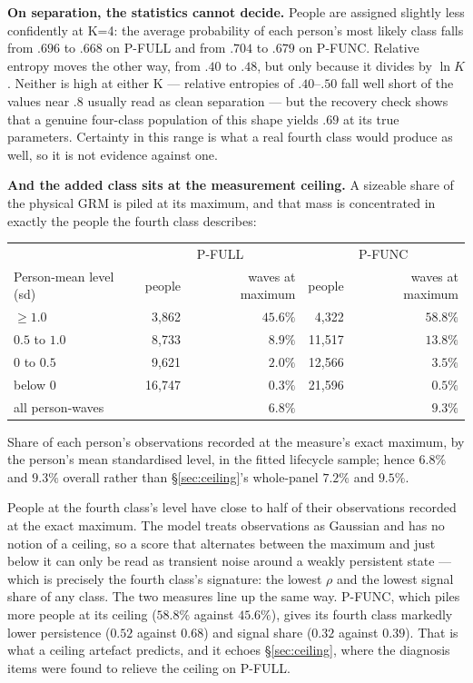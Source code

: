 \documentclass[11pt]{article}
\begin{document}
\textbf{On separation, the statistics cannot decide.} People are assigned
slightly less confidently at K=4: the average probability of each person's
most likely class falls from $.696$ to $.668$ on P-FULL and from $.704$ to
$.679$ on P-FUNC. Relative entropy moves the other way, from $.40$ to $.48$,
but only because it divides by $\ln K$. Neither is high at either K ---
relative entropies of $.40$--$.50$ fall well short of the values near $.8$
usually read as clean separation --- but the recovery check shows that a
genuine four-class population of this shape yields $.69$ at its true
parameters. Certainty in this range is what a real fourth class would produce
as well, so it is not evidence against one.

\textbf{And the added class sits at the measurement ceiling.} A sizeable
share of the physical GRM is piled at its maximum, and that mass is
concentrated in exactly the people the fourth class describes:

\begin{center}\small
\begin{tabular}{lrrrr}
\toprule
 & \multicolumn{2}{c}{P-FULL} & \multicolumn{2}{c}{P-FUNC} \\
Person-mean level (sd) & people & waves at maximum & people & waves at maximum \\
\midrule
$\ge 1.0$ & 3{,}862 & $\mathbf{45.6\%}$ & 4{,}322 & $\mathbf{58.8\%}$ \\
$0.5$ to $1.0$ & 8{,}733 & $8.9\%$ & 11{,}517 & $13.8\%$ \\
$0$ to $0.5$ & 9{,}621 & $2.0\%$ & 12{,}566 & $3.5\%$ \\
below $0$ & 16{,}747 & $0.3\%$ & 21{,}596 & $0.5\%$ \\
\midrule
all person-waves & & $6.8\%$ & & $9.3\%$ \\
\bottomrule
\end{tabular}

{\scriptsize Share of each person's observations recorded at the measure's
exact maximum, by the person's mean standardised level, in the fitted
lifecycle sample; hence $6.8\%$ and $9.3\%$ overall rather than
\S\ref{sec:ceiling}'s whole-panel $7.2\%$ and $9.5\%$.}
\end{center}

People at the fourth class's level have close to half of their observations
recorded at the exact maximum. The model treats observations as Gaussian and
has no notion of a ceiling, so a score that alternates between the maximum
and just below it can only be read as transient noise around a weakly
persistent state --- which is precisely the fourth class's signature: the
lowest $\rho$ and the lowest signal share of any class. The two measures line
up the same way. P-FUNC, which piles more people at its ceiling ($58.8\%$
against $45.6\%$), gives its fourth class markedly lower persistence ($0.52$
against $0.68$) and signal share ($0.32$ against $0.39$). That is what a
ceiling artefact predicts, and it echoes \S\ref{sec:ceiling}, where the
diagnosis items were found to relieve the ceiling on P-FULL.
\end{document}
